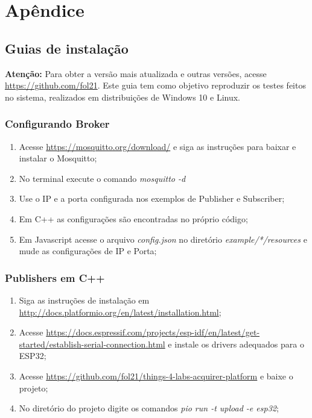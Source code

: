 

\chapter{Apêndice}
\label{chapter:apendice}

\section{Guias de instalação}
\label{section:guia}

\textbf{Atenção:} Para obter a versão mais atualizada e outras versões, acesse \url{https://github.com/fol21}. Este guia tem como objetivo reproduzir os testes feitos no sistema, realizados em distribuições de Windows 10 e Linux.

\subsection{Configurando Broker}
\label{subsection:guia_broker}

\begin{enumerate}

\item Acesse \url{https://mosquitto.org/download/} e siga as instruções para baixar e instalar o Mosquitto;
\item No terminal execute o comando \textit{mosquitto -d}
\item Use o IP e a porta configurada nos exemplos de Publisher e Subscriber;
\item Em C++ as configurações são encontradas no próprio código;
\item Em Javascript acesse o arquivo \textit{config.json} no diretório \textit{example/*/resources} e mude as configurações de IP e Porta;
\end{enumerate}

\subsection{Publishers em C++}
\label{subsection:guia_publishers_cpp}

\begin{enumerate}

\item Siga as instruções de instalação em \url{http://docs.platformio.org/en/latest/installation.html};
\item Acesse \url{https://docs.espressif.com/projects/esp-idf/en/latest/get-started/establish-serial-connection.html} e instale os drivers adequados para o ESP32;
\item Acesse \url{https://github.com/fol21/things-4-labs-acquirer-platform} e baixe o projeto;
\item No diretório do projeto digite os comandos \textit{pio run -t upload -e esp32};
\end{enumerate}

